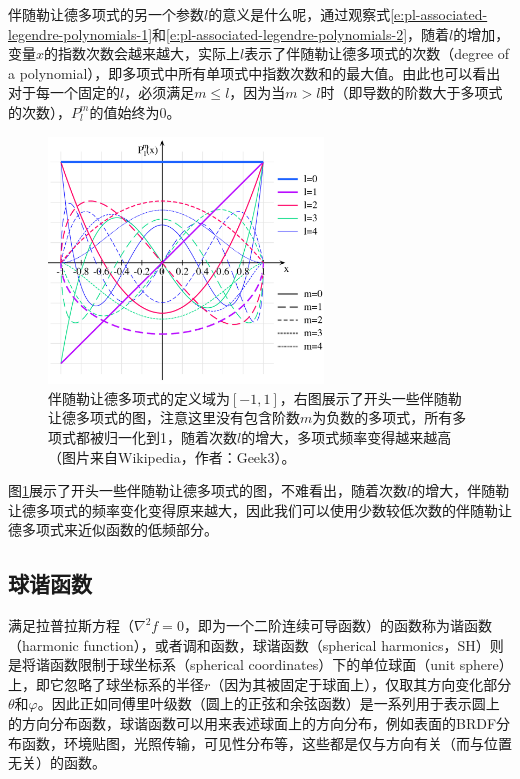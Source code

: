 伴随勒让德多项式的另一个参数$l$的意义是什么呢，通过观察式\ref{e:pl-associated-legendre-polynomials-1}和\ref{e:pl-associated-legendre-polynomials-2}，随着$l$的增加，变量$x$的指数次数会越来越大，实际上$l$表示了伴随勒让德多项式的次数（degree of a polynomial），即多项式中所有单项式中指数次数和的最大值。由此也可以看出对于每一个固定的$l$，必须满足$m\leq l$，因为当$m>l$时（即导数的阶数大于多项式的次数），$P^{m}_l$的值始终为0。

\begin{figure}
\sidecaption
	\includegraphics[width=0.65\textwidth]{figures/prt/associated-legendre-functions}
	\caption{伴随勒让德多项式的定义域为$[-1,1]$，右图展示了开头一些伴随勒让德多项式的图，注意这里没有包含阶数$m$为负数的多项式，所有多项式都被归一化到1，随着次数$l$的增大，多项式频率变得越来越高（图片来自Wikipedia，作者：Geek3）。}
	\label{f:pl-associated-legendre-functions}
\end{figure}

图\ref{f:pl-associated-legendre-functions}展示了开头一些伴随勒让德多项式的图，不难看出，随着次数$l$的增大，伴随勒让德多项式的频率变化变得原来越大，因此我们可以使用少数较低次数的伴随勒让德多项式来近似函数的低频部分。




\subsection{球谐函数}
满足拉普拉斯方程（$\nabla^{2} f=0$，即为一个二阶连续可导函数）的函数称为谐函数（harmonic function），或者调和函数，球谐函数（spherical harmonics，SH）则是将谐函数限制于球坐标系（spherical coordinates）下的单位球面（unit sphere）上，即它忽略了球坐标系的半径$r$（因为其被固定于球面上），仅取其方向变化部分$\theta$和$\varphi$。因此正如同傅里叶级数（圆上的正弦和余弦函数）是一系列用于表示圆上的方向分布函数，球谐函数可以用来表述球面上的方向分布，例如表面的BRDF分布函数，环境贴图，光照传输，可见性分布等，这些都是仅与方向有关（而与位置无关）的函数。

